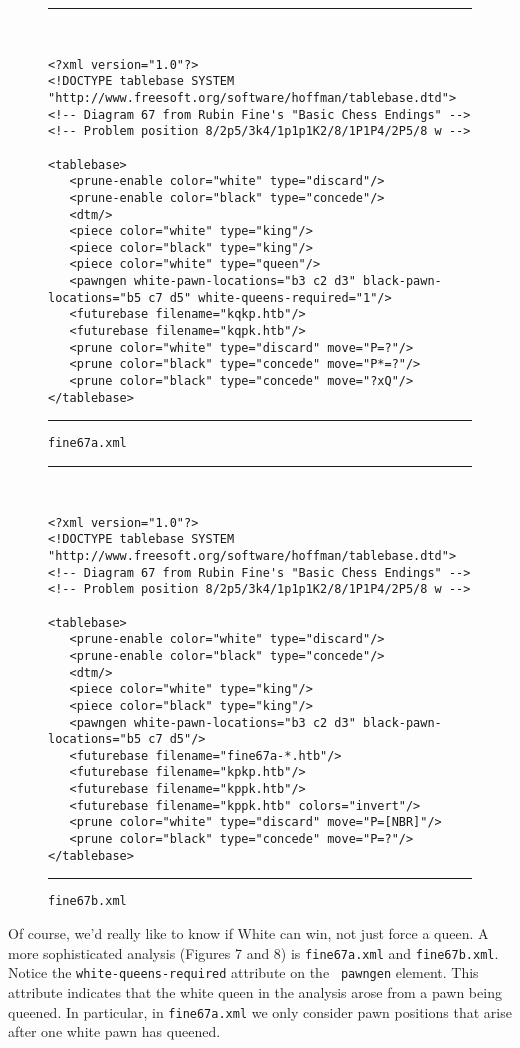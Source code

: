 \documentclass[11pt]{article}
\begin{document}
\begin{figure}
\hrule\ 
{\small\begin{verbatim}
<?xml version="1.0"?>
<!DOCTYPE tablebase SYSTEM "http://www.freesoft.org/software/hoffman/tablebase.dtd">
<!-- Diagram 67 from Rubin Fine's "Basic Chess Endings" -->
<!-- Problem position 8/2p5/3k4/1p1p1K2/8/1P1P4/2P5/8 w -->

<tablebase>
   <prune-enable color="white" type="discard"/>
   <prune-enable color="black" type="concede"/>
   <dtm/>
   <piece color="white" type="king"/>
   <piece color="black" type="king"/>
   <piece color="white" type="queen"/>
   <pawngen white-pawn-locations="b3 c2 d3" black-pawn-locations="b5 c7 d5" white-queens-required="1"/>
   <futurebase filename="kqkp.htb"/>
   <futurebase filename="kqpk.htb"/>
   <prune color="white" type="discard" move="P=?"/>
   <prune color="black" type="concede" move="P*=?"/>
   <prune color="black" type="concede" move="?xQ"/>
</tablebase>
\end{verbatim}}
\hrule
\caption{\tt fine67a.xml}
\end{figure}

\begin{figure}
\hrule\ 
{\small\begin{verbatim}
<?xml version="1.0"?>
<!DOCTYPE tablebase SYSTEM "http://www.freesoft.org/software/hoffman/tablebase.dtd">
<!-- Diagram 67 from Rubin Fine's "Basic Chess Endings" -->
<!-- Problem position 8/2p5/3k4/1p1p1K2/8/1P1P4/2P5/8 w -->

<tablebase>
   <prune-enable color="white" type="discard"/>
   <prune-enable color="black" type="concede"/>
   <dtm/>
   <piece color="white" type="king"/>
   <piece color="black" type="king"/>
   <pawngen white-pawn-locations="b3 c2 d3" black-pawn-locations="b5 c7 d5"/>
   <futurebase filename="fine67a-*.htb"/>
   <futurebase filename="kpkp.htb"/>
   <futurebase filename="kppk.htb"/>
   <futurebase filename="kppk.htb" colors="invert"/>
   <prune color="white" type="discard" move="P=[NBR]"/>
   <prune color="black" type="concede" move="P=?"/>
</tablebase>
\end{verbatim}}
\hrule
\caption{\tt fine67b.xml}
\end{figure}

Of course, we'd really like to know if White can win, not just force a
queen.  A more sophisticated analysis (Figures 7 and 8) is {\tt fine67a.xml}
and {\tt fine67b.xml}.
Notice the {\tt white-queens-required} attribute on the {\tt
pawngen} element.  This attribute indicates that the white queen
in the analysis arose from a pawn being queened.  In particular,
in {\tt fine67a.xml}
we only consider pawn positions that arise after one white
pawn has queened.
\end{document}
